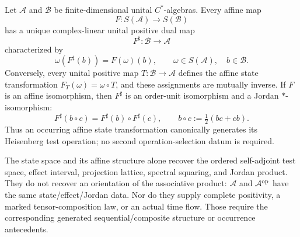 \documentclass[12pt,a4paper]{article}
\begin{document}
\begin{theorem}
\label{p2:thm:state-dual-affine-operation-reconstruction}
Let \(\mathcal A\) and \(\mathcal B\) be finite-dimensional unital
\(C^*\)-algebras.  Every affine map
\[
 F:S(\mathcal A)\longrightarrow S(\mathcal B)
\]
has a unique complex-linear unital positive dual map
\[
 F^\sharp:\mathcal B\longrightarrow\mathcal A
\]
characterized by
\[
 \omega\!\left(F^\sharp(b)\right)=F(\omega)(b),
 \qquad
 \omega\in S(\mathcal A),\quad b\in\mathcal B.
\]
Conversely, every unital positive map
\(T:\mathcal B\to\mathcal A\) defines the affine state transformation
\(F_T(\omega)=\omega\circ T\), and these assignments are mutually inverse.
If \(F\) is an affine isomorphism, then \(F^\sharp\) is an order-unit
isomorphism and a Jordan \(*\)-isomorphism:
\[
 F^\sharp(b\circ c)=F^\sharp(b)\circ F^\sharp(c),
 \qquad b\circ c:=\tfrac12(bc+cb).
\]
Thus an occurring affine state transformation canonically
generates its Heisenberg test operation; no second operation-selection datum
is required.

The state space and its affine structure alone recover the ordered
self-adjoint test space, effect interval, projection lattice, spectral
squaring, and Jordan product.  They do not recover an orientation of the
associative product: \(\mathcal A\) and \(\mathcal A^{\rm op}\) have the same
state/effect/Jordan data.  Nor do they supply complete positivity, a marked
tensor-composition law, or an actual time flow.  Those require the
corresponding generated sequential/composite structure or occurrence
antecedents.
\end{theorem}
\end{document}
